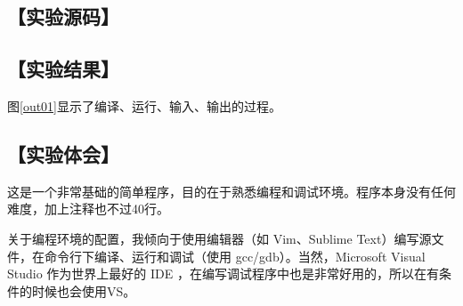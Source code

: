 \subsection*{【实验源码】}
{\linespread{1}}
\subsection*{【实验结果】}
图\ref{out01}显示了编译、运行、输入、输出的过程。
\subsection*{【实验体会】}
这是一个非常基础的简单程序，目的在于熟悉编程和调试环境。程序本身没有任何难度，加上注释也不过40行。

关于编程环境的配置，我倾向于使用编辑器（如 Vim、Sublime Text）编写源文件，在命令行下编译、运行和调试（使用 gcc/gdb）。当然，Microsoft Visual Studio 作为世界上最好的 IDE ，在编写调试程序中也是非常好用的，所以在有条件的时候也会使用VS。

\clearpage\newpage
